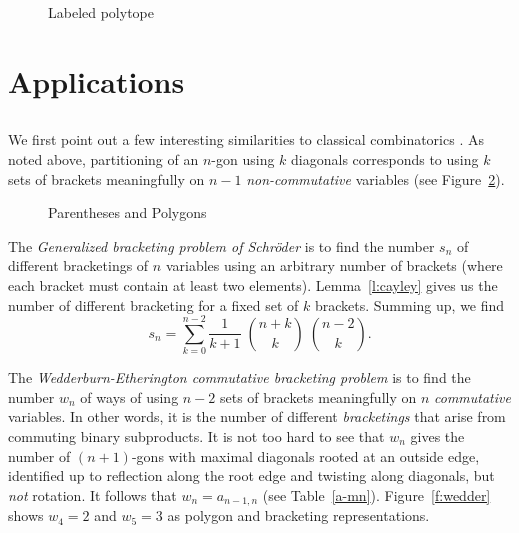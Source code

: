 \documentclass[10pt]{amsart}
\begin{document}
            \begin{figure}[h]
            \caption{Labeled polytope}
            \label{isocube}
            \end{figure}
            
            
            \section {Applications}
            
            \subsection{}
            We first point out a few interesting similarities to classical combinatorics \cite[\S1.15]{comtet}.  As noted above, partitioning of an $n$-gon using $k$ diagonals corresponds to using $k$ sets of brackets meaningfully on $n-1$ {\em non-commutative} variables (see Figure~\ref{k4}). 
             
            \begin{figure}[h]
            \caption{Parentheses and Polygons}
            \label{k4}
            \end{figure}
            
            The {\em Generalized bracketing problem of Schr\"oder} is to find the number $s_n$ of different bracketings of $n$ variables using an arbitrary number of brackets (where each bracket must contain at least two elements).  Lemma~\ref{l:cayley} gives us the number of different bracketing for a fixed set of $k$ brackets.  Summing up, we find
            $$s_n = \sum_{k=0}^{n-2} \frac{1}{k+1} \; \binom{n+k}{k} \; \binom{n-2}{k}.$$
            
            The {\em Wedderburn-Etherington commutative bracketing problem} is to find the number $w_n$ of ways of using $n-2$ sets of brackets meaningfully on $n$ {\em commutative} variables. In other words, it is the number of different {\em bracketings} that arise from commuting binary subproducts. It is not too hard to see that $w_n$ gives the number of $(n+1)$-gons with maximal diagonals rooted at an outside edge, identified up to reflection along the root edge and twisting along diagonals, but {\em not} rotation.  It follows that $w_n = a_{n-1, n}$ (see Table~\ref{a-mn}).  Figure~\ref{f:wedder} shows $w_4 = 2$ and $w_5 = 3$ as polygon and bracketing representations.
            
\end{document}
